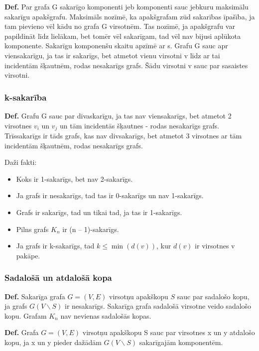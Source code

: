 \documentclass{article}
\begin{document}
\textbf{Def.}  Par grafa G sakarīgo komponenti jeb komponenti sauc jebkuru maksimālu sakarīgu apakšgrafu.
Maksimāls nozīmē, ka apakšgrafam zūd sakarības īpašība, ja tam pievieno vēl kādu no grafa G virsotnēm. Tas nozīmē, ja apakšgrafu var papildināt līdz lielākam, bet tomēr vēl sakarīgam, tad vēl nav bijusi aplūkota komponente.  Sakarīgu komponenšu skaitu apzīmē ar s.  Grafu G sauc apr viensakarīgu, ja tas ir sakarīgs, bet atmetot vienu virsotni v līdz ar tai incidentām šķautnēm, rodas nesakarīgs grafs. Šādu virsotni v sauc par sasaistes virsotni.

\subsubsection{k-sakarība}

\textbf{Def.} Grafu G sauc par divaskarīgu, ja tas nav viensakarīgs, bet atmetot 2 virsotnes $v_i$ un $v_j$ un tām incidentās šķautnes - rodas nesakarīgs grafs. Trīssakarīgs ir tāds grafs, kas nav divsakarīgs, bet atmetot 3 virsotnes ar tām incidentām šķautnēm, rodas nesakarīgs grafs.

Daži fakti:
\begin{itemize}
	\item Koks ir 1-sakarīgs, bet nav 2-sakarīgs.
	\item Ja grafs ir nesakarīgs, tad tas ir 0-sakarīgs un nav 1-sakarīgs.
	\item Grafs ir sakarīgs, tad un tikai tad, ja tas ir 1-sakarīgs.
	\item Pilns grafs $K_n$ ir (n – 1)-sakarīgs.
	\item Ja grafs ir k-sakarīgs, tad $k \le \min(d(v))$, kur $d(v)$ ir virsotnes v pakāpe.
\end{itemize}

\subsubsection{Sadalošā un atdalošā kopa}

\textbf{Def.}  Sakarīga grafa $G = (V, E)$ virsotņu apakškopu $S$ sauc par sadalošo kopu, ja grafs $G(V \backslash S)$ ir nesakarīgs.
Sakarīga grafa sadalošā virsotne veido sadalošo kopu.  Grafam $K_n$ nav nevienas sadalošās kopas.

\textbf{Def.}  Grafa $G = (V, E)$ virsotņu apakškopu S sauc par virsotnes x un y atdalošo kopu, ja x un y pieder dažādām $G(V \backslash S)$ sakarīgajām komponentēm.
\end{document}
